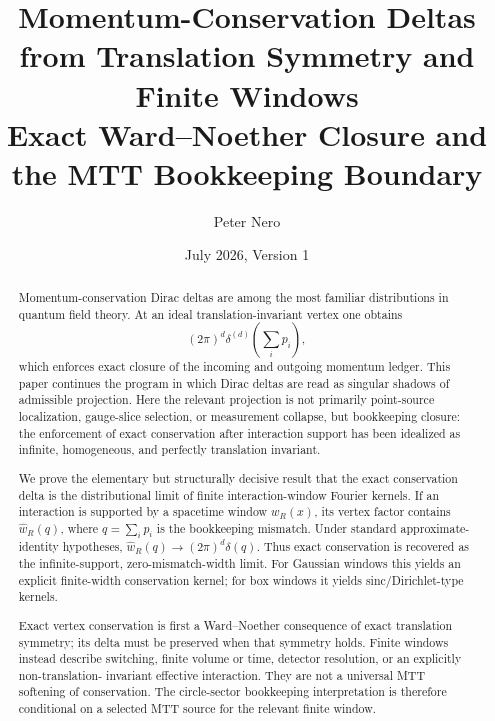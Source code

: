\documentclass[11pt]{article}
\title{Momentum-Conservation Deltas from Translation Symmetry and Finite Windows\\
\large Exact Ward--Noether Closure and the MTT Bookkeeping Boundary}
\author{Peter Nero}
\date{July 2026, Version 1}
\begin{document}
\maketitle

\begin{abstract}
Momentum-conservation Dirac deltas are among the most familiar distributions in quantum field theory.  At an ideal translation-invariant vertex one obtains
\[
(2\pi)^d\delta^{(d)}\!\left(\sum_i p_i\right),
\]
which enforces exact closure of the incoming and outgoing momentum ledger.  This paper continues the program in which Dirac deltas are read as singular shadows of admissible projection.  Here the relevant projection is not primarily point-source localization, gauge-slice selection, or measurement collapse, but bookkeeping closure: the enforcement of exact conservation after interaction support has been idealized as infinite, homogeneous, and perfectly translation invariant.

We prove the elementary but structurally decisive result that the exact conservation delta is the distributional limit of finite interaction-window Fourier kernels.  If an interaction is supported by a spacetime window \(w_R(x)\), its vertex factor contains \(\widehat w_R(q)\), where \(q=\sum_i p_i\) is the bookkeeping mismatch.  Under standard approximate-identity hypotheses, \(\widehat w_R(q)\to (2\pi)^d\delta(q)\).  Thus exact conservation is recovered as the infinite-support, zero-mismatch-width limit.  For Gaussian windows this yields an explicit finite-width conservation kernel; for box windows it yields sinc/Dirichlet-type kernels.

Exact vertex conservation is first a Ward--Noether consequence of exact translation symmetry;
its delta must be preserved when that symmetry holds.  Finite windows instead describe
switching, finite volume or time, detector resolution, or an explicitly non-translation-
invariant effective interaction.  They are not a universal MTT softening of conservation.
The circle-sector bookkeeping interpretation is therefore conditional on a selected MTT
source for the relevant finite window.
\end{abstract}
\end{document}

